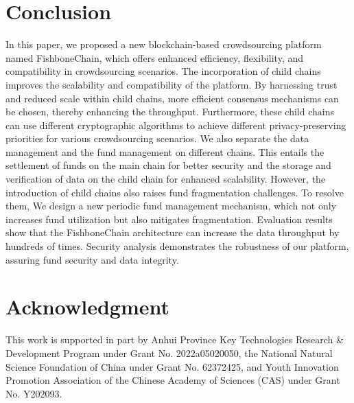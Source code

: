 \documentclass[10pt,journal]{IEEEtran}
\begin{document}
\section{Conclusion}\label{section:conclusion}
In this paper, we proposed a new blockchain-based crowdsourcing platform named FishboneChain, which offers enhanced efficiency, flexibility, and compatibility in crowdsourcing scenarios. The incorporation of child chains improves the scalability and compatibility of the platform. By harnessing trust and reduced scale within child chains, more efficient consensus mechanisms can be chosen, thereby enhancing the throughput. Furthermore, these child chains can use different cryptographic algorithms to achieve different privacy-preserving priorities for various crowdsourcing scenarios. We also separate the data management and the fund management on different chains. This entails the settlement of funds on the main chain for better security and the storage and verification of data on the child chain for enhanced scalability. However, the introduction of child chains also raises fund fragmentation challenges. To resolve them, We design a new periodic fund management mechanism, which not only increases fund utilization but also mitigates fragmentation. Evaluation results show that the FishboneChain architecture can increase the data throughput by hundreds of times. Security analysis demonstrates the robustness of our platform, assuring fund security and data integrity.

\section*{Acknowledgment}
This work is supported in part by Anhui Province Key Technologies Research \& Development Program under Grant No. 2022a05020050, the National Natural Science Foundation of China under Grant No. 62372425, and Youth Innovation Promotion Association of the Chinese Academy of Sciences (CAS) under Grant No. Y202093.



\end{document}

